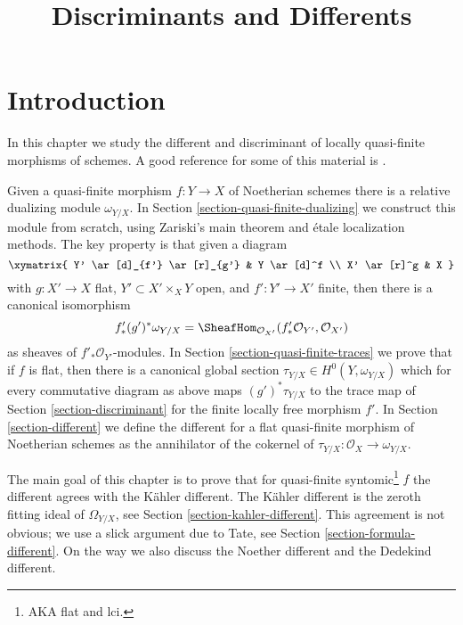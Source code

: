 

%


\title{Discriminants and Differents}


\maketitle

\label{section-phantom}

\tableofcontents

\section{Introduction}
\label{section-introduction}

\noindent
In this chapter we study the different and discriminant
of locally quasi-finite morphisms of schemes.
A good reference for some of this material is \cite{Kunz}.

\medskip\noindent
Given a quasi-finite morphism $f : Y \to X$ of Noetherian schemes
there is a relative dualizing module $\omega_{Y/X}$. 
In Section \ref{section-quasi-finite-dualizing}
we construct this module from scratch, using
Zariski's main theorem and \'etale localization methods.
The key property is that given a diagram
$$
\xymatrix{
Y' \ar[d]_{f'} \ar[r]_{g'} & Y \ar[d]^f \\
X' \ar[r]^g & X
}
$$
with $g : X' \to X$ flat, $Y' \subset X' \times_X Y$ open, and
$f' : Y' \to X'$ finite, then there is a canonical isomorphism
$$
f'_*(g')^*\omega_{Y/X} =
\SheafHom_{\mathcal{O}_{X'}}(f'_*\mathcal{O}_{Y'}, \mathcal{O}_{X'})
$$
as sheaves of $f'_*\mathcal{O}_{Y'}$-modules. In
Section \ref{section-quasi-finite-traces} we prove that
if $f$ is flat, then there is a canonical global section
$\tau_{Y/X} \in H^0(Y, \omega_{Y/X})$ which for every commutative
diagram as above maps $(g')^*\tau_{Y/X}$ to the trace map
of Section \ref{section-discriminant}
for the finite locally free morphism $f'$.
In Section \ref{section-different}
we define the different for a flat quasi-finite
morphism of Noetherian schemes as the annihilator of the
cokernel of $\tau_{Y/X} : \mathcal{O}_X \to \omega_{Y/X}$.

\medskip\noindent
The main goal of this chapter is to prove that for
quasi-finite syntomic\footnote{AKA flat and lci.} $f$ the
different agrees with the K\"ahler different.
The K\"ahler different is the zeroth fitting ideal of $\Omega_{Y/X}$, see
Section \ref{section-kahler-different}.
This agreement is not obvious; we use a slick argument
due to Tate, see Section \ref{section-formula-different}.
On the way we also discuss the Noether different
and the Dedekind different.

